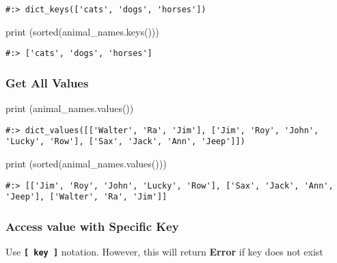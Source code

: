 \documentclass[
]{book}
\newenvironment{Shaded}{\begin{snugshade}}{\end{snugshade}}
\newcommand{\BuiltInTok}[1]{#1}
\newcommand{\NormalTok}[1]{#1}
\begin{document}
\begin{verbatim}
#:> dict_keys(['cats', 'dogs', 'horses'])
\end{verbatim}

\begin{Shaded}
\begin{Highlighting}[]
\BuiltInTok{print}\NormalTok{ (}\BuiltInTok{sorted}\NormalTok{(animal\_names.keys()))}
\end{Highlighting}
\end{Shaded}

\begin{verbatim}
#:> ['cats', 'dogs', 'horses']
\end{verbatim}

\hypertarget{get-all-values}{%
\subsubsection{Get All Values}\label{get-all-values}}

\begin{Shaded}
\begin{Highlighting}[]
\BuiltInTok{print}\NormalTok{ (animal\_names.values())}
\end{Highlighting}
\end{Shaded}

\begin{verbatim}
#:> dict_values([['Walter', 'Ra', 'Jim'], ['Jim', 'Roy', 'John', 'Lucky', 'Row'], ['Sax', 'Jack', 'Ann', 'Jeep']])
\end{verbatim}

\begin{Shaded}
\begin{Highlighting}[]
\BuiltInTok{print}\NormalTok{ (}\BuiltInTok{sorted}\NormalTok{(animal\_names.values()))}
\end{Highlighting}
\end{Shaded}

\begin{verbatim}
#:> [['Jim', 'Roy', 'John', 'Lucky', 'Row'], ['Sax', 'Jack', 'Ann', 'Jeep'], ['Walter', 'Ra', 'Jim']]
\end{verbatim}

\hypertarget{access-value-with-specific-key}{%
\subsubsection{Access value with Specific Key}\label{access-value-with-specific-key}}

Use \textbf{\texttt{{[}\ key\ {]}}} notation. However, this will return \textbf{Error} if key does not exist
\end{document}
